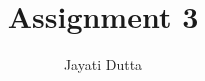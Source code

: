 \documentclass[journal,12pt,twocolumn]{IEEEtran}
\begin{document}
\let\StandardTheFigure\thefigure
\let\vec\mathbf
\renewcommand{\thefigure}{\theproblem}



\def\putbox#1#2#3{\makebox[0in][l]{\makebox[#1][l]{}\raisebox{\baselineskip}[0in][0in]{\raisebox{#2}[0in][0in]{#3}}}}
     \def\rightbox#1{\makebox[0in][r]{#1}}
     \def\centbox#1{\makebox[0in]{#1}}
     \def\topbox#1{\raisebox{-\baselineskip}[0in][0in]{#1}}
     \def\midbox#1{\raisebox{-0.5\baselineskip}[0in][0in]{#1}}

\vspace{3cm}

\title{Assignment 3}
\author{Jayati Dutta}


%
%
%

% 
%
\end{document}

